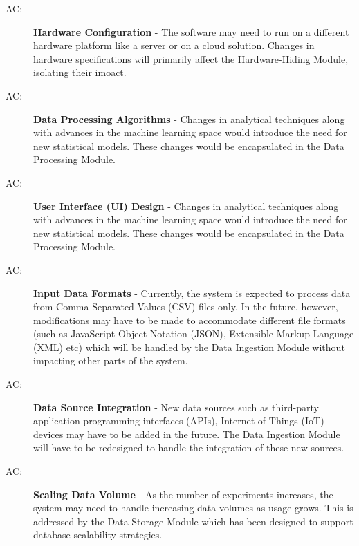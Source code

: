 \documentclass[12pt, titlepage]{article}
\newcounter{acnum}
\newcommand{\actheacnum}{AC\theacnum}
\begin{document}
\begin{description}
  \item[ \actheacnum \label{acHardware}:] \textbf{Hardware Configuration} - 
  The software may need to run on a different hardware platform like a server or on a 
  cloud solution. Changes in hardware specifications will primarily affect the Hardware-Hiding 
  Module, isolating their imoact.
  
  \item[ \actheacnum \label{acProcessing}:] \textbf{Data Processing Algorithms} - 
  Changes in analytical techniques along with advances in the machine learning space would
  introduce the need for new statistical models. These changes would be encapsulated in the
  Data Processing Module.

  \item[ \actheacnum \label{acInterface}:] \textbf{User Interface (UI) Design} - 
  Changes in analytical techniques along with advances in the machine learning space would
  introduce the need for new statistical models. These changes would be encapsulated in the
  Data Processing Module.

  \item[ \actheacnum \label{acInput}:] \textbf{Input Data Formats} - 
  Currently, the system is expected to process data from Comma Separated Values (CSV) files only.
  In the future, however, modifications may have to be made to accommodate different file 
  formats (such as JavaScript Object Notation (JSON), Extensible Markup Language (XML) etc)
  which will be handled by the Data Ingestion Module without impacting other parts of the system.

  \item[ \actheacnum \label{acSource}:] \textbf{Data Source Integration} - 
  New data sources such as third-party application programming interfaces (APIs), Internet of Things
  (IoT) devices may have to be added in the future. The Data Ingestion Module will have to be 
  redesigned to handle the integration of these new sources.

  \item[ \actheacnum \label{acScaling}:] \textbf{Scaling Data Volume} - 
  As the number of experiments increases, the system may need to handle increasing data volumes
  as usage grows. This is addressed by the Data Storage Module which has been designed to support
  database scalability strategies.


\end{description}
\end{document}
